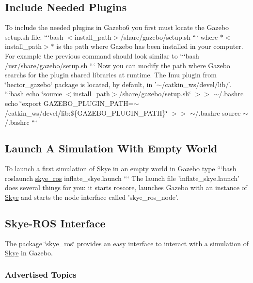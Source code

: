 {\ttfamily \subsection*{Include Needed Plugins}}

{\ttfamily  To include the needed plugins in Gazebo6 you first must locate the Gazebo setup.\-sh file\-: ```bash $<$install\-\_\-path$>$/share/gazebo/setup.sh ``` where $\ast$$<$install\-\_\-path$>$$\ast$ is the path where Gazebo has been installed in your computer. For example the previous command should look similar to ```bash /usr/share/gazebo/setup.sh ``` Now you can modify the path where Gazebo searchs for the plugin shared libraries at runtime. The Imu plugin from \char`\"{}hector\-\_\-gazebo\char`\"{} package is located, by default, in '$\sim$/catkin\-\_\-ws/devel/lib/'. ```bash echo \char`\"{}source $<$install\-\_\-path$>$/share/gazebo/setup.\-sh\char`\"{} $>$$>$ $\sim$/.bashrc echo \char`\"{}export G\-A\-Z\-E\-B\-O\-\_\-\-P\-L\-U\-G\-I\-N\-\_\-\-P\-A\-T\-H=$\sim$/catkin\-\_\-ws/devel/lib\-:\$\{\-G\-A\-Z\-E\-B\-O\-\_\-\-P\-L\-U\-G\-I\-N\-\_\-\-P\-A\-T\-H\}\char`\"{} $>$$>$ $\sim$/.bashrc source $\sim$/.bashrc ```}

{\ttfamily \subsection*{Launch A Simulation With Empty World}}

{\ttfamily  To launch a first simulation of \hyperlink{class_skye}{Skye} in an empty world in Gazebo type ```bash roslaunch \hyperlink{namespaceskye__ros}{skye\-\_\-ros} inflate\-\_\-skye.\-launch ``` The launch file 'inflate\-\_\-skye.\-launch' does several things for you\-: it starts roscore, launches Gazebo with an instance of \hyperlink{class_skye}{Skye} and starts the node interface called 'skye\-\_\-ros\-\_\-node'.}

{\ttfamily \subsection*{Skye-\/\-R\-O\-S Interface}}

{\ttfamily  The package \char`\"{}skye\-\_\-ros\char`\"{} provides an easy interface to interact with a simulation of \hyperlink{class_skye}{Skye} in Gazebo.}

{\ttfamily \subsubsection*{Advertised Topics}}

